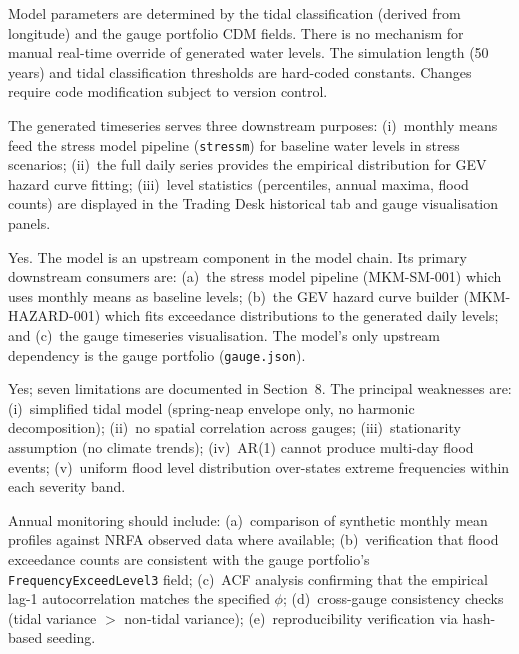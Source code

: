 \documentclass[11pt,a4paper]{article}
\begin{document}
Model parameters are determined by the tidal classification (derived from longitude) and the gauge portfolio CDM fields. There is no mechanism for manual real-time override of generated water levels. The simulation length (50 years) and tidal classification thresholds are hard-coded constants. Changes require code modification subject to version control.

The generated timeseries serves three downstream purposes: (i)~monthly means feed the stress model pipeline (\texttt{stressm}) for baseline water levels in stress scenarios; (ii)~the full daily series provides the empirical distribution for GEV hazard curve fitting; (iii)~level statistics (percentiles, annual maxima, flood counts) are displayed in the Trading Desk historical tab and gauge visualisation panels.

Yes. The model is an upstream component in the model chain. Its primary downstream consumers are: (a)~the stress model pipeline (MKM-SM-001) which uses monthly means as baseline levels; (b)~the GEV hazard curve builder (MKM-HAZARD-001) which fits exceedance distributions to the generated daily levels; and (c)~the gauge timeseries visualisation. The model's only upstream dependency is the gauge portfolio (\texttt{gauge.json}).

Yes; seven limitations are documented in Section~8. The principal weaknesses are: (i)~simplified tidal model (spring-neap envelope only, no harmonic decomposition); (ii)~no spatial correlation across gauges; (iii)~stationarity assumption (no climate trends); (iv)~AR(1) cannot produce multi-day flood events; (v)~uniform flood level distribution over-states extreme frequencies within each severity band.

Annual monitoring should include: (a)~comparison of synthetic monthly mean profiles against NRFA observed data where available; (b)~verification that flood exceedance counts are consistent with the gauge portfolio's \texttt{FrequencyExceedLevel3} field; (c)~ACF analysis confirming that the empirical lag-1 autocorrelation matches the specified $\phi$; (d)~cross-gauge consistency checks (tidal variance $>$ non-tidal variance); (e)~reproducibility verification via hash-based seeding.
\end{document}
